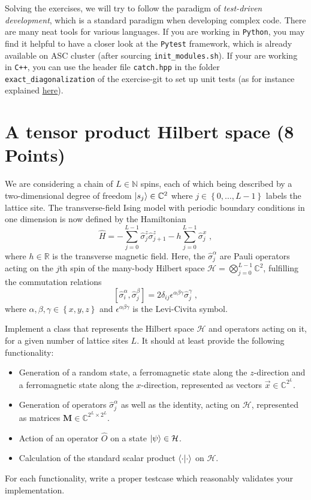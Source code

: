 \documentclass[a4paper, 12pt]{article}
\begin{document}
%
Solving the exercises, we will try to follow the paradigm of \textit{test-driven development}, which is a standard paradigm when developing complex code.
%
There are many neat tools for various languages.
%
If you are working in \texttt{Python}, you may find it helpful to have a closer look at the \texttt{Pytest} framework, which is already available on ASC cluster (after sourcing \texttt{init\_modules.sh}).
%
If your are working in \texttt{C++}, you can use the header file \texttt{catch.hpp} in the folder \texttt{exact\_diagonalization} of the exercise-git to set up unit tests (as for instance explained \href{https://medium.com/dsckiit/a-guide-to-using-catch2-for-unit-testing-in-c-f0f5450d05fb}{here}).
%

%
\section{A tensor product Hilbert space \textbf{(8 Points)}}
%
We are considering a chain of $L\in\mathbb N$ spins, each of which being described by a two-dimensional degree of freedom $\ket{s_j} \in \mathbb C^2$ where $j\in\left\{0,\ldots,L-1 \right\}$ labels the lattice site.
%
The transverse-field Ising model with periodic boundary conditions in one dimension is now defined by the Hamiltonian
\begin{equation}
	\hat H = -\sum_{j=0}^{L-1} \hat \sigma^z_j \hat \sigma^z_{j+1} - h \sum_{j=0}^{L-1} \hat \sigma^x_j \;, \label{eq:tfim}
\end{equation}
where $h\in\mathbb R$ is the transverse magnetic field.
%
Here, the $\hat \sigma^\alpha_j$ are Pauli operators acting on the $j$th spin of the many-body Hilbert space $\mathcal H = \bigotimes_{j=0}^{L-1} \mathbb C^2$, fulfilling the commutation relations
\begin{equation}
	 \left[ \hat \sigma^\alpha_i, \hat \sigma^\beta_j \right] = 2\delta_{ij}\epsilon^{\alpha\beta\gamma}\hat\sigma^\gamma_j \;,
\end{equation}
where $\alpha,\beta,\gamma\in \left\{x,y,z \right\}$ and $\epsilon^{\alpha\beta\gamma}$ is the Levi-Civita symbol.
%

%
Implement a class that represents the Hilbert space $\mathcal H$ and operators acting on it, for a given number of lattice sites $L$.
%
It should at least provide the following functionality:
\begin{itemize}
	\item Generation of a random state, a ferromagnetic state along the $z$-direction and a ferromagnetic state along the $x$-direction, represented as vectors $\vec x \in \mathbb C^{2^L}$.
	\item Generation of operators $\hat \sigma^\alpha_j$ as well as the identity, acting on $\mathcal{H}$, represented as matrices $\mathbf M \in \mathbb C^{2^L \times 2^L}$.
	\item Action of an operator $\hat O$ on a state $\ket{\psi} \in \mathcal H$.
	\item Calculation of the standard scalar product $\braket{\cdot | \cdot}$ on $\mathcal H$.
\end{itemize}
%
For each functionality, write a proper testcase which reasonably validates your implementation.
%
\end{document}
